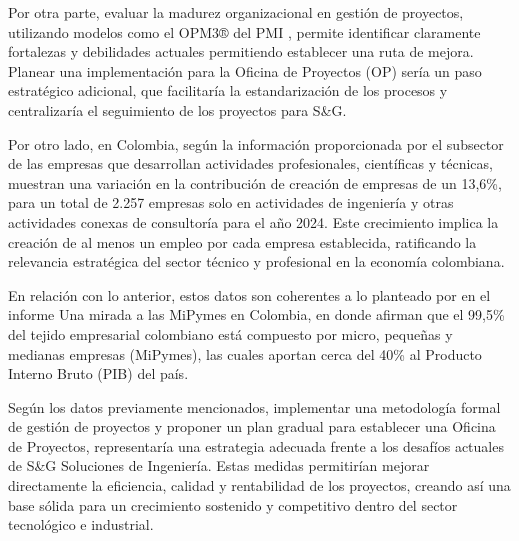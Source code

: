 Por otra parte, evaluar la madurez organizacional en gestión de proyectos, utilizando modelos como el OPM3® del PMI \parencite{projectmanagementinstitutestandard2018}, permite identificar claramente fortalezas y debilidades actuales permitiendo establecer una ruta de mejora. Planear una implementación para la Oficina de Proyectos (OP) sería un paso estratégico adicional, que facilitaría la estandarización de los procesos y centralizaría el seguimiento de los proyectos para S\&G.

Por otro lado, en Colombia, según la información proporcionada por \parencite[p. 8]{confecamarasDinamica2025} el subsector de las empresas que desarrollan actividades profesionales, científicas y técnicas, muestran una variación en la contribución de creación de empresas de un 13,6\%, para un total de 2.257 empresas solo en actividades de ingeniería y otras actividades conexas de consultoría para el año 2024. Este crecimiento implica la creación de al menos un empleo por cada empresa establecida, ratificando la relevancia estratégica del sector técnico y profesional en la economía colombiana.

En relación con lo anterior, estos datos son coherentes a lo planteado por \parencite{gonzalezmirada2024} en el informe Una mirada a las MiPymes en Colombia, en donde afirman que el 99,5\% del tejido empresarial colombiano está compuesto por micro, pequeñas y medianas empresas (MiPymes), las cuales aportan cerca del 40\% al Producto Interno Bruto (PIB) del país.

Según los datos previamente mencionados, implementar una metodología formal de gestión de proyectos y proponer un plan gradual para establecer una Oficina de Proyectos, representaría una estrategia adecuada frente a los desafíos actuales de S\&G Soluciones de Ingeniería. Estas medidas permitirían mejorar directamente la eficiencia, calidad y rentabilidad de los proyectos, creando así una base sólida para un crecimiento sostenido y competitivo dentro del sector tecnológico e industrial.